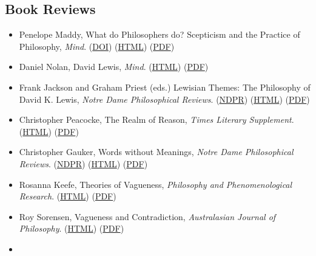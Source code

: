 \documentclass[
  10pt,
  letterpaper,
  DIV=11,
  numbers=noendperiod,
  twoside]{scrartcl}
\providecommand{\tightlist}{%
  \setlength{\itemsep}{0pt}\setlength{\parskip}{0pt}}\usepackage{longtable,booktabs,array}
\begin{document}
\subsection{Book Reviews}\label{book-reviews}

\begin{itemize}
\tightlist
\item
  Penelope Maddy, What do Philosophers do? Scepticism and the Practice
  of Philosophy, \emph{Mind}.
  (\href{https://doi.org/10.1093/mind/fzy024}{DOI})
  (\href{./posts/review-maddy/review-of-what-do-philosophers-do.html}{HTML})
  (\href{./posts/review-maddy/Review\%20of\%20What\%20Do\%20Philosophers\%20Do.pdf}{PDF})
\item
  Daniel Nolan, David Lewis, \emph{Mind}.
  (\href{./posts/review-lewisian-themes/review-of-lewisian-themes.html}{HTML})
  (\href{./posts/review-lewisian-themes/Review\%20of\%20Lewisian\%20Themes.pdf}{PDF})
\item
  Frank Jackson and Graham Priest (eds.) Lewisian Themes: The Philosophy
  of David K. Lewis, \emph{Notre Dame Philosophical Reviews}.
  (\href{http://ndpr.nd.edu/review.cfm?id=3381}{NDPR})
  (\href{./posts/review-lewisian-themes/review-of-lewisian-themes.html}{HTML})
  (\href{./posts/review-lewisian-themes/Review\%20of\%20Lewisian\%20Themes.pdf}{PDF})
\item
  Christopher Peacocke, The Realm of Reason, \emph{Times Literary
  Supplement}.
  (\href{./posts/review-realm/review-of-the-realm-of-reason.html}{HTML})
  (\href{./posts/review-realm/Review\%20of\%20The\%20Realm\%20of\%20Reason.pdf}{PDF})
\item
  Christopher Gauker, Words without Meanings, \emph{Notre Dame
  Philosophical Reviews}.
  (\href{http://ndpr.nd.edu/review.cfm?id=1333}{NDPR})
  (\href{./posts/review-gauker/review-of-words-without-meaning.html}{HTML})
  (\href{./posts/review-gauker/Review\%20of\%20Words\%20Without\%20Meaning.pdf}{PDF})
\item
  Rosanna Keefe, Theories of Vagueness, \emph{Philosophy and
  Phenomenological Research}.
  (\href{./posts/review-keefe/review-of-theories-of-vagueness.html}{HTML})
  (\href{./posts/review-keefe/Review\%20of\%20Theories\%20of\%20Vagueness.pdf}{PDF})
\item
  Roy Sorensen, Vagueness and Contradiction, \emph{Australasian Journal
  of Philosophy}.
  (\href{./posts/review-sorensen/review-of-vagueness-and-contradiction.html}{HTML})
  (\href{./posts/review-sorensen/Review\%20of\%20Vagueness\%20and\%20Contradiction.pdf}{PDF})
\item

\end{itemize}
\end{document}
